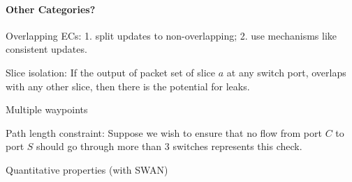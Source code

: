 \paragraph{Other Categories?}

Overlapping ECs:
1. split updates to non-overlapping; 2. use mechanisms like consistent updates.

Slice isolation: If the output
of packet set of slice $a$ at any switch port, overlaps with any other slice,
then there is the potential for leaks. 

Multiple waypoints 

Path length constraint: Suppose
we wish to ensure that no flow from port $C$ to port $S$ should go through more
than 3 switches represents this check.

Quantitative properties (with SWAN)     
\fi                    
